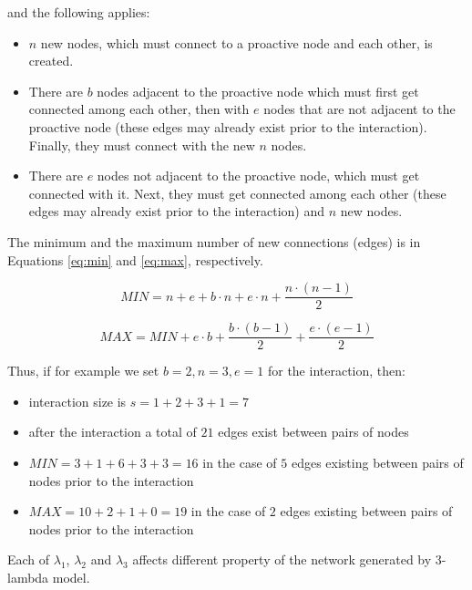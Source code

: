 and the following applies:

\begin{itemize}
	\item $n$ new nodes, which must connect to a proactive node and each other, is created.
	\item There are $b$ nodes adjacent to the proactive node which must first get connected among each other, then with $e$ nodes that are not adjacent to the proactive node (these edges may already exist prior to the interaction). Finally, they must connect with the new $n$ nodes.
	\item There are $e$ nodes not adjacent to the proactive node, which must get connected with it. Next, they must get connected among each other (these edges may already exist prior to the interaction) and $n$ new nodes.
\end{itemize}


The minimum and the maximum number of new connections (edges) is in Equations \ref{eq:min} and \ref{eq:max}, respectively.

\begin{equation}	MIN = n + e + b \cdot n + e \cdot n + \frac{n \cdot (n - 1)}{2} \label{eq:min}
\end{equation}

\begin{equation} MAX = MIN + e \cdot b + \frac{b \cdot (b - 1)}{2} + \frac{e \cdot (e - 1)}{2} \label{eq:max}
\end{equation}

Thus, if for example we set $b = 2, n = 3, e = 1$ for the interaction, then:

\begin{itemize}
	\item interaction size is $s = 1 + 2 + 3 + 1 = 7$
	\item after the interaction a total of $21$ edges exist between pairs of nodes
	\item $MIN = 3 + 1 + 6 + 3 + 3 = 16$ in the case of $5$ edges existing between pairs of nodes prior to the interaction
	\item $MAX = 10 + 2 + 1 + 0 = 19$ in the case of $2$ edges existing between pairs of nodes prior to the interaction
\end{itemize}

Each of $\lambda_1$, $\lambda_2$ and $\lambda_3$ affects different property of the network generated by 3-lambda model.

